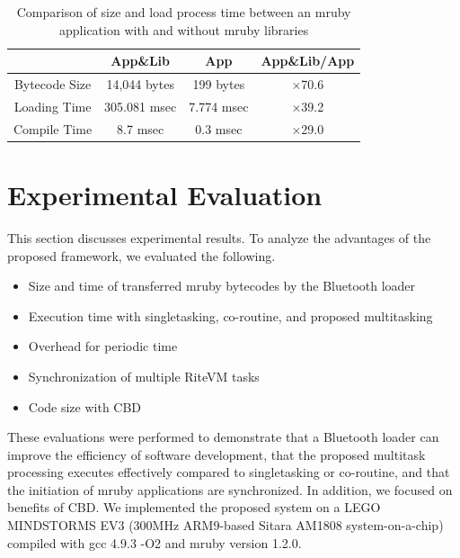 \documentclass{sig-alternate-05-2015}
\begin{document}
\begin{table}[t]
    \centering
    \vspace{1mm}
\caption{Comparison of size and load process time between an mruby application with and without mruby libraries}
    \vspace{1mm}
    {\tabcolsep=0.1cm
    \begin{tabular}{c||c|c|c}
                            & App\&Lib     & App        &   App\&Lib/App  \\ \hline
          Bytecode Size     & 14,044 bytes & 199 bytes  &   $\times$70.6          \\ %
          Loading Time      & 305.081 msec & 7.774 msec &   $\times$39.2          \\
          Compile Time  & 8.7 msec     & 0.3 msec   &   $\times$29.0          \\
    \end{tabular}
    }
    \label{tab:size_and_time}
\end{table}

\section{Experimental Evaluation}
\label{sec:Evaluation}
This section discusses experimental results.
To analyze the advantages of the proposed framework, we evaluated the following.
\begin{itemize}
    \item Size and time of transferred mruby bytecodes by the Bluetooth loader
    \item Execution time with singletasking, co-routine, and proposed multitasking
    \item Overhead for periodic time
    \item Synchronization of multiple RiteVM tasks
    \item Code size with CBD 
\end{itemize}

These evaluations were performed to demonstrate that a Bluetooth loader can improve the efficiency of software development, that the proposed multitask processing executes effectively compared to singletasking or co-routine, and that the initiation of mruby applications are synchronized.
In addition, we focused on benefits of CBD.
We implemented the proposed system on a LEGO MINDSTORMS EV3 \cite{par:EV3} (300MHz ARM9-based Sitara AM1808 system-on-a-chip) compiled with gcc 4.9.3 -O2 and mruby version 1.2.0.
\end{document}
